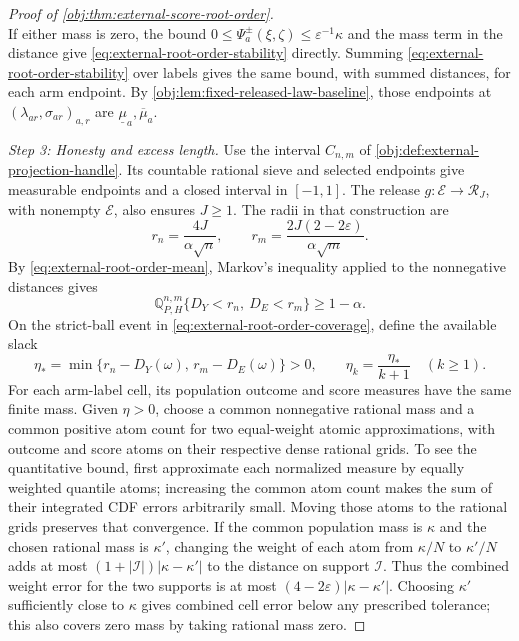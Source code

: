 \documentclass[11pt]{article}
\begin{document}
\begin{proof}[Proof of \cref{obj:thm:external-score-root-order}]
\[\]
If either mass is zero, the bound \(0\leq\Psi_a^\pm(\xi,\zeta)\leq\varepsilon^{-1}\kappa\) and the mass term in the distance give \cref{eq:external-root-order-stability} directly. Summing \cref{eq:external-root-order-stability} over labels gives the same bound, with summed distances, for each arm endpoint. By \cref{obj:lem:fixed-released-law-baseline}, those endpoints at \((\lambda_{ar},\sigma_{ar})_{a,r}\) are \(\underline\mu_a,\overline\mu_a\). %

\emph{Step 3: Honesty and excess length.}
Use the interval \(C_{n,m}\) of \cref{obj:def:external-projection-handle}. Its countable rational sieve and selected endpoints give measurable endpoints and a closed interval in \([-1,1]\). The release \(g:\mathcal E\to\mathcal R_J\), with nonempty \(\mathcal E\), also ensures \(J\geq1\). The radii in that construction are
\[
r_n=\frac{4J}{\alpha\sqrt n},
\qquad
r_m=\frac{2J(2-2\varepsilon)}{\alpha\sqrt m}.
\]
By \cref{eq:external-root-order-mean}, Markov's inequality applied to the nonnegative distances gives
\[
\mathbb Q_{P,H}^{n,m}\{D_Y<r_n,\ D_E<r_m\}\geq1-\alpha. \label{eq:external-root-order-coverage}
\]
On the strict-ball event in \cref{eq:external-root-order-coverage}, define the available slack
\[
\eta_* = \min\{r_n-D_Y(\omega),\,r_m-D_E(\omega)\}>0,
\qquad \eta_k=\frac{\eta_*}{k+1}\quad(k\geq1).
\]
For each arm-label cell, its population outcome and score measures have the same finite mass. Given \(\eta>0\), choose a common nonnegative rational mass and a common positive atom count for two equal-weight atomic approximations, with outcome and score atoms on their respective dense rational grids. To see the quantitative bound, first approximate each normalized measure by equally weighted quantile atoms; increasing the common atom count makes the sum of their integrated CDF errors arbitrarily small. Moving those atoms to the rational grids preserves that convergence. If the common population mass is \(\kappa\) and the chosen rational mass is \(\kappa'\), changing the weight of each atom from \(\kappa/N\) to \(\kappa'/N\) adds at most \((1+|\mathcal I|)|\kappa-\kappa'|\) to the distance on support \(\mathcal I\). Thus the combined weight error for the two supports is at most \((4-2\varepsilon)|\kappa-\kappa'|\). Choosing \(\kappa'\) sufficiently close to \(\kappa\) gives combined cell error below any prescribed tolerance; this also covers zero mass by taking rational mass zero.


\end{proof}
\end{document}
